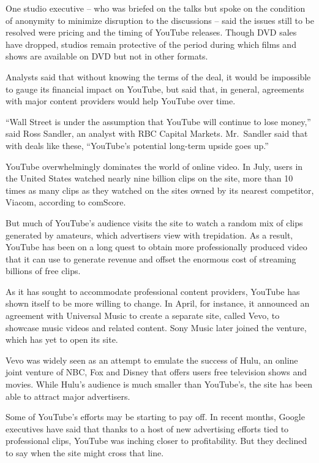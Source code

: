 ﻿\documentclass[12pt]{article}
\begin{document}
One studio executive -- who was briefed on the talks but spoke on the condition of anonymity to
minimize disruption to the discussions -- said the issues still to be resolved were pricing and the
timing of YouTube releases. Though DVD sales have dropped, studios remain protective of the period
during which films and shows are available on DVD but not in other formats.

Analysts said that without knowing the terms of the deal, it would be impossible to gauge its
financial impact on YouTube, but said that, in general, agreements with major content providers
would help YouTube over time.

``Wall Street is under the assumption that YouTube will continue to lose money,'' said Ross Sandler,
an analyst with RBC Capital Markets. Mr.~Sandler said that with deals like these, ``YouTube's
potential long-term upside goes up.''

YouTube overwhelmingly dominates the world of online video. In July, users in the United States
watched nearly nine billion clips on the site, more than 10 times as many clips as they watched on
the sites owned by its nearest competitor, Viacom, according to comScore.

But much of YouTube's audience visits the site to watch a random mix of clips generated by amateurs,
which advertisers view with trepidation\cite{trepidation}. As a result, YouTube has been on a long
quest to obtain more professionally produced video that it can use to generate revenue and offset
the enormous cost of streaming billions of free clips.

As it has sought to accommodate professional content providers, YouTube has shown itself to be more
willing to change. In April, for instance, it announced an agreement with Universal Music to create
a separate site, called Vevo, to showcase music videos and related content. Sony Music later joined
the venture, which has yet to open its site.

Vevo was widely seen as an attempt to emulate the success of Hulu, an online joint venture of NBC,
Fox and Disney that offers users free television shows and movies. While Hulu's audience is much
smaller than YouTube's, the site has been able to attract major advertisers.

Some of YouTube's efforts may be starting to pay off. In recent months, Google executives have said
that thanks to a host of new advertising efforts tied to professional clips, YouTube was inching
closer to profitability. But they declined to say when the site might cross that line.
\end{document}
